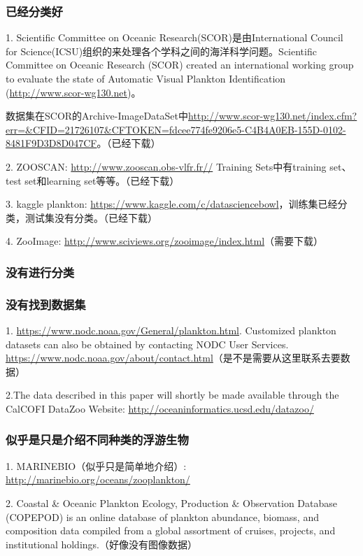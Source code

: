\subsubsection{已经分类好}
1. Scientific Committee on Oceanic Research(SCOR)是由International Council for Science(ICSU)组织的来处理各个学科之间的海洋科学问题。Scientific Committee on Oceanic Research (SCOR) created an international working group to evaluate the state of Automatic Visual Plankton Identification (\url{http://www.scor-wg130.net})\cite{gorsky2010digital}。

数据集在SCOR的Archive-ImageDataSet中\url{http://www.scor-wg130.net/index.cfm?err=&CFID=21726107&CFTOKEN=fdcee774fe9206e5-C4B4A0EB-155D-0102-8481F9D3D8D047CF}。（已经下载）

2. ZOOSCAN: \url{http://www.zooscan.obs-vlfr.fr//} Training Sets中有training set、test set和learning set等等。（已经下载）


3. kaggle plankton: \url{https://www.kaggle.com/c/datasciencebowl}，训练集已经分类，测试集没有分类。（已经下载）

4. ZooImage: \url{http://www.sciviews.org/zooimage/index.html}（需要下载）

\subsubsection{没有进行分类}

\subsubsection{没有找到数据集}
1. \url{https://www.nodc.noaa.gov/General/plankton.html}. Customized plankton datasets can also be obtained by contacting NODC User Services. \url{https://www.nodc.noaa.gov/about/contact.html}（是不是需要从这里联系去要数据）

2.The data described in this paper will shortly be made available through the CalCOFI DataZoo Website: \url{http://oceaninformatics.ucsd.edu/datazoo/}


\subsubsection{似乎是只是介绍不同种类的浮游生物}
1. MARINEBIO（似乎只是简单地介绍）: \url{http://marinebio.org/oceans/zooplankton/}

2. Coastal \& Oceanic Plankton Ecology, Production \& Observation Database (COPEPOD) is an online database of plankton abundance, biomass, and composition data compiled from a global assortment of cruises, projects, and institutional holdings.（好像没有图像数据）

